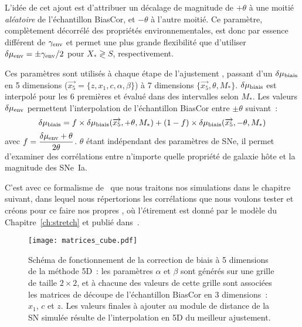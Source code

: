 \documentclass[../main/main.tex]{subfiles}
\begin{document}
L'idée de cet ajout est d'attribuer un décalage de magnitude de $+\theta$ à une
moitié \textit{aléatoire} de l'échantillon BiasCor, et $-\theta$ à l'autre
moitié. Ce paramètre, complètement décorrélé des propriétés environnementales,
est donc par essence différent de $\gamma_{\rm env}$ et permet une plus grande
flexibilité que d'utiliser $\delta\mu_{\rm env} = \pm\gamma_{\rm env}/2$ pour
$X_* \gtrless S$, respectivement.

Ces paramètres sont utilisés à chaque étape de l'ajustement \bbc, passant d'un
$\delta\mu_{\rm biais}$ en 5 dimensions ($\overrightarrow{x_5} = \{z, x_1, c,
\alpha, \beta\}$) à 7 dimensions $\{\overrightarrow{x_5}, \theta, M_*\}$.
$\delta\mu_{\rm biais}$ est interpolé pour les 6 premières et évalué dans des
intervalles selon $M_*$. Les valeurs $\delta\mu_{\rm env}$ permettent
l'interpolation de l'échantillon BiasCor entre $\pm\theta$ suivant~:
\begin{equation}
    \delta\mu_{\rm biais} =
    f\times\delta\mu_{\rm biais}(\overrightarrow{x_5}, +\theta, M_*)
    + (1-f)\times\delta\mu_{\rm biais}(\overrightarrow{x_5}, -\theta, M_*)
\end{equation}
avec $\displaystyle f = \frac{\delta\mu_{\rm env}+\theta}{2\theta}$. $\theta$ étant
indépendant des paramètres de SNe, il permet d'examiner des corrélations entre
n'importe quelle propriété de galaxie hôte et la magnitude des SNe~Ia.

C'est avec ce formalisme de \bbc\ que nous traitons nos simulations dans le
chapitre suivant, dans lequel nous répertorions les corrélations que nous
voulons tester et créons pour ce faire nos propres \hostlib, où l'étirement est
donné par le modèle du Chapitre~\ref{ch:stretch} et publié
dans~\cite{nicolas2021}.

\begin{landscape}
\begin{figure}[p]
    \centerfloat
    \texttt{[image: matrices\_cube.pdf]}
    \caption[Schéma de fonctionnement de la correction de biais à 5 dimensions
    de la méthode \bbc5D]{Schéma de fonctionnement de la correction de biais à 5
        dimensions de la méthode \bbc5D~: les paramètres $\alpha$ et $\beta$
        sont générés sur une grille de taille $2\times2$, et à chacune des
        valeurs de cette grille sont associées les matrices de découpe de
    l'échantillon BiasCor en 3 dimensions~: $x_1$, $c$ et $z$. Les valeurs
finales à ajouter au module de distance de la SN simulée résulte de
l'interpolation en 5D du meilleur ajustement.}
    \label{fig:mat5D}
\end{figure}
\end{landscape}
\end{document}
